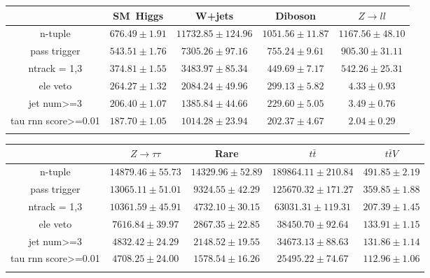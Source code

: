 \centering
\begin{tabular}{ccccc} \toprule\toprule
 & SM~Higgs & W+jets & Diboson & $Z\to ll$\\\midrule
n-tuple & $676.49\pm1.91$ & $11732.85\pm124.96$ & $1051.56\pm11.87$ & $1167.56\pm48.10$\\
pass trigger & $543.51\pm1.76$ & $7305.26\pm97.16$ & $755.24\pm9.61$ & $905.30\pm31.11$\\
ntrack = 1,3 & $374.81\pm1.55$ & $3483.97\pm85.34$ & $449.69\pm7.17$ & $542.26\pm25.31$\\
ele veto & $264.27\pm1.32$ & $2084.24\pm49.96$ & $299.13\pm5.82$ & $4.33\pm0.93$\\
jet num>=3 & $206.40\pm1.07$ & $1385.84\pm44.66$ & $229.60\pm5.05$ & $3.49\pm0.76$\\
tau rnn score>=0.01 & $187.70\pm1.05$ & $1014.28\pm23.94$ & $202.37\pm4.67$ & $2.04\pm0.29$\\
\bottomrule\bottomrule\\
\end{tabular}
\begin{tabular}{ccccc} \toprule\toprule
 & $Z\to \tau\tau$ & Rare & $t\bar{t}$ & $t\bar{t}V$\\\midrule
n-tuple & $14879.46\pm55.73$ & $14329.96\pm52.89$ & $189864.11\pm210.84$ & $491.85\pm2.19$\\
pass trigger & $13065.11\pm51.01$ & $9324.55\pm42.29$ & $125670.32\pm171.27$ & $359.85\pm1.88$\\
ntrack = 1,3 & $10361.59\pm45.91$ & $4732.10\pm30.15$ & $63031.31\pm119.31$ & $207.39\pm1.45$\\
ele veto & $7616.84\pm39.97$ & $2867.35\pm22.85$ & $38450.70\pm92.64$ & $133.91\pm1.15$\\
jet num>=3 & $4832.42\pm24.29$ & $2148.52\pm19.55$ & $34673.13\pm88.63$ & $131.86\pm1.14$\\
tau rnn score>=0.01 & $4708.25\pm24.00$ & $1578.54\pm16.26$ & $25495.22\pm74.67$ & $112.96\pm1.06$\\
\bottomrule\bottomrule\\
\end{tabular}
